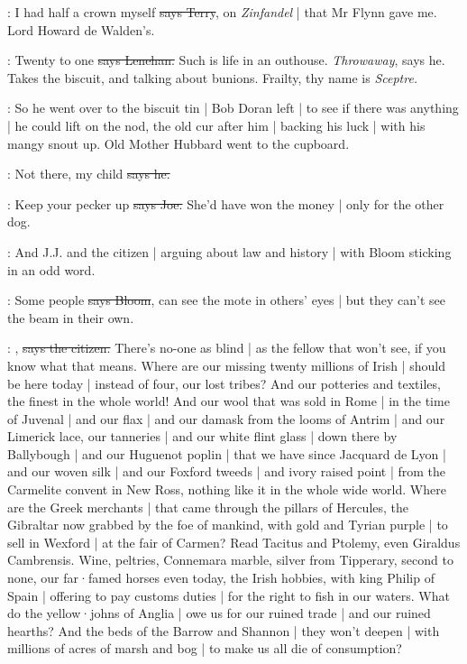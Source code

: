 \terry:
I had half a crown myself
\sout{says Terry},
on \emph{Zinfandel} |
that Mr Flynn gave me.
Lord Howard de Walden's.

\lenehan:
Twenty to one
\sout{says Lenehan.}
Such is life in an outhouse.
\emph{Throwaway},
says he.
Takes the biscuit,
and talking about bunions.
Frailty,
thy name is \emph{Sceptre.}

\Nq:
So he went over to the biscuit tin |
Bob Doran left |
to see if there was anything |
he could lift on the nod,
the old cur after him |
backing his luck |
with his mangy snout up.
Old Mother Hubbard went to the cupboard.

\lenehan:
Not there,
my child
\sout{says he.}

\joe:
Keep your pecker up
\sout{says Joe.}
She'd have won the money |
only for the other dog.

\Nq:
And J.J. and the citizen |
arguing about law and history |
with Bloom sticking in an odd word.

\Bloom:
Some people
\sout{says Bloom},
can see the mote in others' eyes |
but they can't see the beam in their own.

\citizen:
,
\sout{says the citizen.}
There's no-one as blind |
as the fellow that won't see,
if you know what that means.
Where are our missing twenty millions of Irish |
should be here today |
instead of four,
our lost tribes?
And our potteries and textiles,
the finest in the whole world!
And our wool that was sold in Rome |
in the time of Juvenal |
and our flax |
and our damask from the looms of Antrim |
and our Limerick lace,
our tanneries |
and our white flint glass |
down there by Ballybough |
and our Huguenot poplin |
that we have since Jacquard de Lyon |
and our woven silk |
and our Foxford tweeds |
and ivory raised point |
from the Carmelite convent in New Ross,
nothing like it in the whole wide world.
Where are the Greek merchants |
that came through the pillars of Hercules,
the Gibraltar now grabbed by the foe of mankind,
with gold and Tyrian purple |
to sell in Wexford |
at the fair of Carmen?
Read Tacitus and Ptolemy,
even Giraldus Cambrensis.
Wine,
peltries,
Connemara marble,
silver from Tipperary,
second to none,
our far·famed horses even today,
the Irish hobbies,
with king Philip of Spain |
offering to pay customs duties |
for the right to fish in our waters.
What do the yellow·johns of Anglia |
owe us for our ruined trade |
and our ruined hearths?
And the beds of the Barrow and Shannon |
they won't deepen |
with millions of acres of marsh and bog |
to make us all die of consumption?

